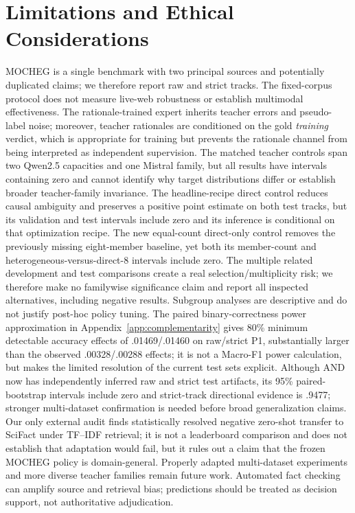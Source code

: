 \documentclass[11pt]{article}
\begin{document}
\section{Limitations and Ethical Considerations}\label{sec:limitations}
MOCHEG is a single benchmark with two principal sources and potentially duplicated claims; we therefore report raw and strict tracks. The fixed-corpus protocol does not measure live-web robustness or establish multimodal effectiveness. The rationale-trained expert inherits teacher errors and pseudo-label noise; moreover, teacher rationales are conditioned on the gold \emph{training} verdict, which is appropriate for training but prevents the rationale channel from being interpreted as independent supervision. The matched teacher controls span two Qwen2.5 capacities and one Mistral family, but all results have intervals containing zero and cannot identify why target distributions differ or establish broader teacher-family invariance. The headline-recipe direct control reduces causal ambiguity and preserves a positive point estimate on both test tracks, but its validation and test intervals include zero and its inference is conditional on that optimization recipe. The new equal-count direct-only control removes the previously missing eight-member baseline, yet both its member-count and heterogeneous-versus-direct-8 intervals include zero. The multiple related development and test comparisons create a real selection/multiplicity risk; we therefore make no familywise significance claim and report all inspected alternatives, including negative results. Subgroup analyses are descriptive and do not justify post-hoc policy tuning. The paired binary-correctness power approximation in Appendix~\ref{app:complementarity} gives 80\% minimum detectable accuracy effects of .01469/.01460 on raw/strict P1, substantially larger than the observed .00328/.00288 effects; it is not a Macro-F1 power calculation, but makes the limited resolution of the current test sets explicit. Although AND now has independently inferred raw and strict test artifacts, its 95\% paired-bootstrap intervals include zero and strict-track directional evidence is .9477; stronger multi-dataset confirmation is needed before broad generalization claims. Our only external audit finds statistically resolved negative zero-shot transfer to SciFact under TF--IDF retrieval; it is not a leaderboard comparison and does not establish that adaptation would fail, but it rules out a claim that the frozen MOCHEG policy is domain-general. Properly adapted multi-dataset experiments and more diverse teacher families remain future work. Automated fact checking can amplify source and retrieval bias; predictions should be treated as decision support, not authoritative adjudication.
\end{document}
